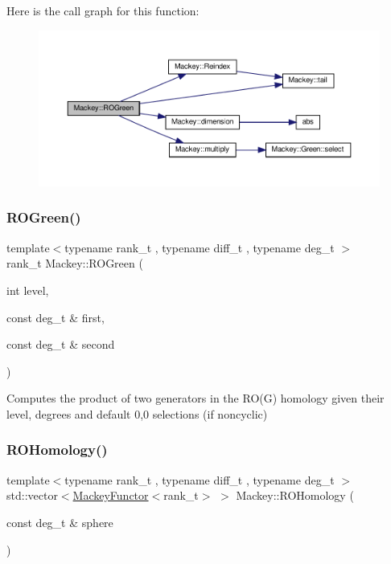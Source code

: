 Here is the call graph for this function\+:\nopagebreak
\begin{figure}[H]
\begin{center}
\leavevmode
\includegraphics[width=350pt]{namespaceMackey_a2bd86833844ca62d76c47a54aeb0bb77_cgraph}
\end{center}
\end{figure}
\mbox{\label{namespaceMackey_a07d3b1e748c6cf2fd8a6e21b948a0afe}} 
\subsubsection{\texorpdfstring{R\+O\+Green()}{ROGreen()}\hspace{0.1cm}{\footnotesize\ttfamily [2/2]}}
{\footnotesize\ttfamily template$<$typename rank\+\_\+t , typename diff\+\_\+t , typename deg\+\_\+t $>$ \\
rank\+\_\+t Mackey\+::\+R\+O\+Green (\begin{DoxyParamCaption}\item[{int}]{level,  }\item[{const deg\+\_\+t \&}]{first,  }\item[{const deg\+\_\+t \&}]{second }\end{DoxyParamCaption})\hspace{0.3cm}{\ttfamily [inline]}}



Computes the product of two generators in the R\+O(\+G) homology given their level, degrees and default 0,0 selections (if noncyclic) 

\mbox{\label{namespaceMackey_a58708ee937b0c4172b7cde8e5f856504}} 
\subsubsection{\texorpdfstring{R\+O\+Homology()}{ROHomology()}}
{\footnotesize\ttfamily template$<$typename rank\+\_\+t , typename diff\+\_\+t , typename deg\+\_\+t $>$ \\
std\+::vector$<$\hyperlink{classMackey_1_1MackeyFunctor}{Mackey\+Functor}$<$rank\+\_\+t$>$ $>$ Mackey\+::\+R\+O\+Homology (\begin{DoxyParamCaption}\item[{const deg\+\_\+t \&}]{sphere }\end{DoxyParamCaption})}



